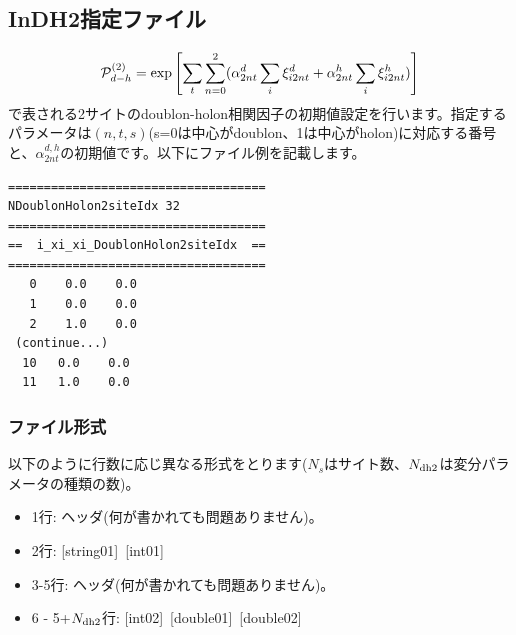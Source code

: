 \newpage
\subsection{InDH2指定ファイル}
\label{Subsec:InDH2}
\begin{equation}
{\cal P}_{d-h}^{(2)}= \exp \left[ \sum_t \sum_{n=0}^2 (\alpha_{2nt}^d \sum_{i}\xi_{i2nt}^d+\alpha_{2nt}^h \sum_{i}\xi_{i2nt}^h)\right]
\end{equation}
で表される2サイトのdoublon-holon相関因子の初期値設定を行います。指定するパラメータは$(n, t, s)$(s=0は中心がdoublon、1は中心がholon)に対応する番号と、$\alpha_{2nt}^{d,h}$の初期値です。以下にファイル例を記載します。

\begin{minipage}{12.5cm}
\begin{screen}
\begin{verbatim}
====================================
NDoublonHolon2siteIdx 32 
====================================
==  i_xi_xi_DoublonHolon2siteIdx  ==
====================================
   0    0.0    0.0
   1    0.0    0.0
   2    1.0    0.0
 (continue...)
  10   0.0    0.0
  11   1.0    0.0
\end{verbatim}
\end{screen}
\end{minipage}

\subsubsection{ファイル形式}
以下のように行数に応じ異なる形式をとります($N_s$はサイト数、$N_{\rm dh2}$は変分パラメータの種類の数)。
 \begin{itemize}
   \item  1行:  ヘッダ(何が書かれても問題ありません)。
   \item  2行:   [string01]~[int01]
   \item  3-5行:  ヘッダ(何が書かれても問題ありません)。
   \item  6 - 5+$N_{\rm dh2}$行: [int02]~[double01]~[double02]
  \end{itemize}

